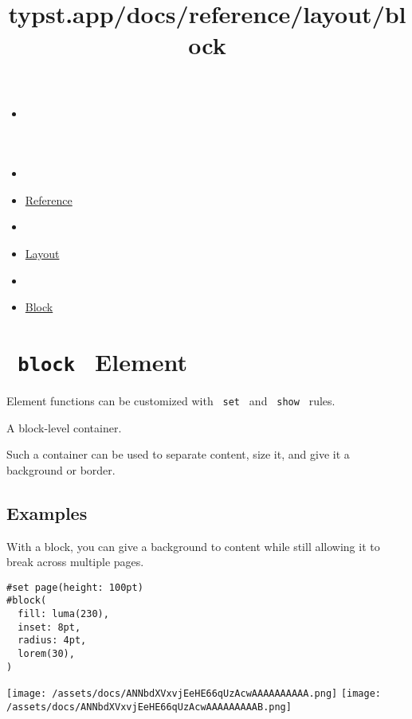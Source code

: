 \title{typst.app/docs/reference/layout/block}

\begin{itemize}
\tightlist
\item
  \href{/docs}{}
\item
  
\item
  \href{/docs/reference/}{Reference}
\item
  
\item
  \href{/docs/reference/layout/}{Layout}
\item
  
\item
  \href{/docs/reference/layout/block/}{Block}
\end{itemize}

\section{\texorpdfstring{\texttt{\ block\ } {{ Element
}}}{ block   Element }}\label{summary}

\label{element-tooltip}
Element functions can be customized with \texttt{\ set\ } and
\texttt{\ show\ } rules.

A block-level container.

Such a container can be used to separate content, size it, and give it a
background or border.

\subsection{Examples}\label{examples}

With a block, you can give a background to content while still allowing
it to break across multiple pages.

\begin{verbatim}
#set page(height: 100pt)
#block(
  fill: luma(230),
  inset: 8pt,
  radius: 4pt,
  lorem(30),
)
\end{verbatim}

\texttt{[image: /assets/docs/ANNbdXVxvjEeHE66qUzAcwAAAAAAAAAA.png]}
\texttt{[image: /assets/docs/ANNbdXVxvjEeHE66qUzAcwAAAAAAAAAB.png]}

